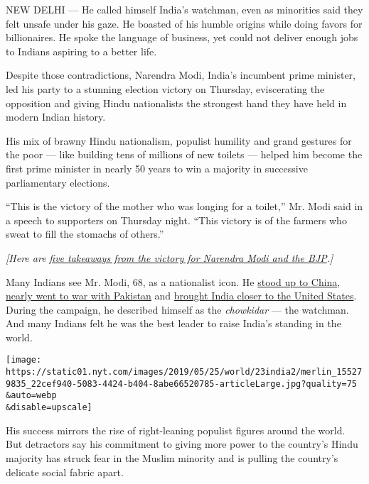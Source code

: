 NEW DELHI --- He called himself India's watchman, even as minorities
said they felt unsafe under his gaze. He boasted of his humble origins
while doing favors for billionaires. He spoke the language of business,
yet could not deliver enough jobs to Indians aspiring to a better life.

Despite those contradictions, Narendra Modi, India's incumbent prime
minister, led his party to a stunning election victory on Thursday,
eviscerating the opposition and giving Hindu nationalists the strongest
hand they have held in modern Indian history.

His mix of brawny Hindu nationalism, populist humility and grand
gestures for the poor --- like building tens of millions of new toilets
--- helped him become the first prime minister in nearly 50 years to win
a majority in successive parliamentary elections.

``This is the victory of the mother who was longing for a toilet,'' Mr.
Modi said in a speech to supporters on Thursday night. ``This victory is
of the farmers who sweat to fill the stomachs of others.''

\emph{{[}Here are}
\href{https://www.nytimes.com/2019/05/23/world/asia/india-election-narendra-modi.html?action=click\&module=Intentional\&pgtype=Article}{\emph{five
takeaways from the victory for Narendra Modi and the BJP}}\emph{.{]}}

Many Indians see Mr. Modi, 68, as a nationalist icon. He
\href{https://www.indiatoday.in/magazine/cover-story/story/20170717-india-china-bhutan-border-dispute-doklam-beijing-siliguri-corridor-1022690-2017-07-07}{stood
up to China},
\href{https://www.nytimes.com/2019/02/25/world/asia/india-pakistan-kashmir-jets.html}{nearly
went to war with Pakistan} and
\href{https://carnegieendowment.org/2019/03/24/modi-s-three-foreign-policy-wins-pub-78675}{brought
India closer to the United States}. During the campaign, he described
himself as the \emph{chowkidar} --- the watchman. And many Indians felt
he was the best leader to raise India's standing in the world.

\texttt{[image: https://static01.nyt.com/images/2019/05/25/world/23india2/merlin\_155279835\_22cef940-5083-4424-b404-8abe66520785-articleLarge.jpg?quality=75\\\&auto=webp\\\&disable=upscale]}

His success mirrors the rise of right-leaning populist figures around
the world. But detractors say his commitment to giving more power to the
country's Hindu majority has struck fear in the Muslim minority and is
pulling the country's delicate social fabric apart.

